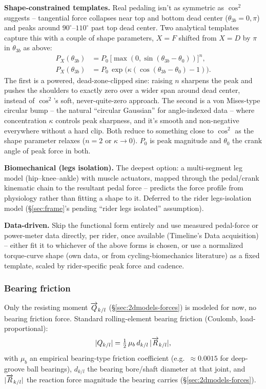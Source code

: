 \textbf{Shape-constrained templates.} Real pedaling isn't as symmetric as $\cos^2$ suggests -- tangential force collapses near top and bottom dead center ($\theta_{3b}=0,\pi$) and peaks around $90^\circ$--$110^\circ$ past top dead center. Two analytical templates capture this with a couple of shape parameters, $X=F$ shifted from $X=D$ by $\pi$ in $\theta_{3b}$ as above:
\begin{align}
    P_X(\theta_{3b}) &= P_0\,\big[\max(0,\sin(\theta_{3b}-\theta_0))\big]^n, \\
    P_X(\theta_{3b}) &= P_0\,\exp\!\big(\kappa(\cos(\theta_{3b}-\theta_0)-1)\big).
\end{align}
The first is a powered, dead-zone-clipped sine: raising $n$ sharpens the peak and pushes the shoulders to exactly zero over a wider span around dead center, instead of $\cos^2$'s soft, never-quite-zero approach. The second is a von Mises-type circular bump -- the natural ``circular Gaussian'' for angle-indexed data -- where concentration $\kappa$ controls peak sharpness, and it's smooth and non-negative everywhere without a hard clip. Both reduce to something close to $\cos^2$ as the shape parameter relaxes ($n=2$ or $\kappa\to0$). $P_0$ is peak magnitude and $\theta_0$ the crank angle of peak force in both.

\textbf{Biomechanical (legs isolation).} The deepest option: a multi-segment leg model (hip--knee--ankle) with muscle actuators, mapped through the pedal/crank kinematic chain to the resultant pedal force -- predicts the force profile from physiology rather than fitting a shape to it. Deferred to the rider legs-isolation model (\S\ref{sec:frame}'s pending ``rider legs isolated'' assumption).

\textbf{Data-driven.} Skip the functional form entirely and use measured pedal-force or power-meter data directly, per rider, once available (Timeline's Data acquisition) -- either fit it to whichever of the above forms is chosen, or use a normalized torque-curve shape (own data, or from cycling-biomechanics literature) as a fixed template, scaled by rider-specific peak force and cadence.

\subsubsection{Bearing friction}
\label{sec:bearing-friction-model}
Only the resisting moment $\overrightarrow{Q}_{k/l}$ (\S\ref{sec:2dmodels-forces}) is modeled for now, no bearing friction force. Standard rolling-element bearing friction (Coulomb, load-proportional):
\begin{equation}
    |Q_{k/l}| = \tfrac{1}{2}\,\mu_b\,d_{k/l}\,|\overrightarrow{R}_{k/l}|,
\end{equation}
with $\mu_b$ an empirical bearing-type friction coefficient (e.g.\ $\approx0.0015$ for deep-groove ball bearings), $d_{k/l}$ the bearing bore/shaft diameter at that joint, and $|\overrightarrow{R}_{k/l}|$ the reaction force magnitude the bearing carries (\S\ref{sec:2dmodels-forces}).
